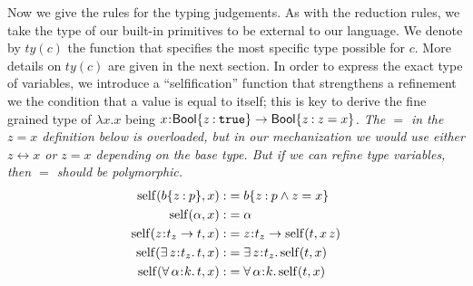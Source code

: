 \documentclass[11pt]{article}
\newcommand{\al}{\alpha}
\newcommand{\bind}{\hspace{0.05em}{:}\hspace{0.05em}} %
\newcommand{\col}{\mathbin{:}}       %
\newcommand{\true}{\mathtt{true}}
\newcommand{\Bool}{{\sf Bool}}
\newcommand{\existype}[3]{\exists\, #1\bind #2.\, #3}
\newcommand{\polytype}[3]{\forall\, #1\bind #2.\, #3}
\newcommand{\functype}[3]{#1\bind #2 \rightarrow #3}
\newcommand{\letin}[3]{{\tt let}\,#1\hspace{0.1em}{=}\hspace{0.1em}#2\,{\tt in}\,#3}
\begin{document}
Now we give the rules for the typing judgements. As with the reduction rules, we take the type of our built-in primitives to be external to our language. We denote by $ty(c)$ the function that specifies the most specific type possible for $c$. More details on $ty(c)$ are given in the next section.
In order to express the exact type of variables, we introduce a ``selfification'' function that strengthens a refinement we the condition that a value is equal to itself; this is key to derive the fine grained type of $\lambda x.x$ being $x\bind\Bool\{z\col \true\} \rightarrow \Bool\{z \col z = x\}$.
{\em The $=$ in the $z=x$ definition below is overloaded, but in our mechanization we would use either $z\leftrightarrow x$ or $z=x$ depending on the base type. But if we can refine type variables, then  $=$ should be polymorphic.}
\begin{align*}
{\rm self}(b\{z\col p\}, x):&= b\{z\col p \wedge z = x\} \\
{\rm self}(\al, x) :&= \al \\
{\rm self}(\functype{z}{t_z}{t}, x) :&= \functype{z}{t_z}{{\rm self}(t, x\, z)} \\
{\rm self}(\existype{z}{t_z}{t}, x) :&= \existype{z}{t_z}{{\rm self}(t, x)} \\
{\rm self}(\polytype{\al}{k}{t}, x) :&= \polytype{\al}{k}{{\rm self}(t, x)} 
\end{align*}

\end{document}

